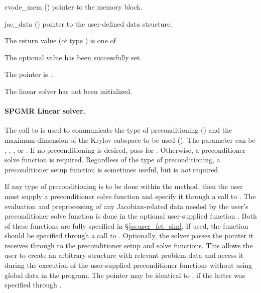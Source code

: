 {
  \begin{args}
  \item[cvode\_mem] ()
    pointer to the {\cvode} memory block.
  \item[jac\_data] ()
    pointer to the user-defined data structure.
  \end{args}
}
{
  The return value  (of type ) is one of
  \begin{args}
  \item[\Id{CVBAND\_SUCCESS}] 
    The optional value has been successfully set.
  \item[\Id{CVBAND\_MEM\_NULL}]
    The  pointer is .
  \item[\Id{CVBAND\_LMEM\_NULL}]
    The {\cvdense} linear solver has not been initialized.
  \end{args}
}
{}
\noindent\paragraph{\bf SPGMR Linear solver.}
The call to  is used to communicate the type of preconditioning 
() and the maximum dimension of the Krylov subspace to be used
().  The  parameter can be ,
, , or .
If no preconditioning is desired, pass  for .
Otherwise, a preconditioner solve function  is required.  
Regardless of the type of preconditioning, a preconditioner setup function 
 is sometimes useful, but is {\em not} required. 

If any type of preconditioning is to be done within the {\spgmr} method,
then the user must supply a preconditioner solve function 
and specify it through a call to .
The evaluation and preprocessing of any Jacobian-related data needed
by the user's preconditioner solve function is done in the optional
user-supplied function . Both of these functions are
fully specified in \S\ref{ss:user_fct_sim}.
If used, the  function should be specified through a call to
.
Optionally, the {\cvspgmr} solver passes the pointer it receives through 
 to the preconditioner setup and solve functions.  
This allows the user to create an arbitrary structure with relevant problem data 
and access it during the execution of the user-supplied preconditioner functions
without using global data in the program.  
The pointer  may be identical to , if the latter was 
specified through .

